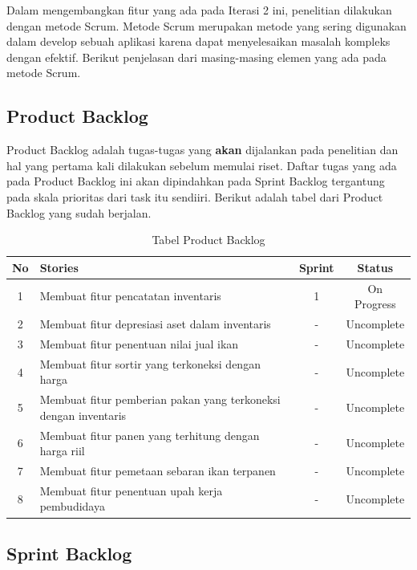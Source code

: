 Dalam mengembangkan fitur yang ada pada Iterasi 2 ini, penelitian dilakukan dengan metode Scrum. Metode Scrum merupakan metode yang sering digunakan dalam develop sebuah aplikasi karena dapat menyelesaikan masalah kompleks dengan efektif. Berikut penjelasan dari masing-masing elemen yang ada pada metode Scrum.

\subsection{Product Backlog}

Product Backlog adalah tugas-tugas yang \textbf{akan} dijalankan pada penelitian dan hal yang pertama kali dilakukan sebelum memulai riset. Daftar tugas yang ada pada Product Backlog ini akan dipindahkan pada Sprint Backlog tergantung pada skala prioritas dari task itu sendiiri. Berikut adalah tabel dari Product Backlog yang sudah berjalan.

\begin{table}[H]	
	\begin{center}
		\caption{Tabel Product Backlog}
		\label{tab:table5}
		\begin{tabular}{|c|m{17em}|c|c|}
		\hline
		\textbf{No} & \textbf{Stories} & \textbf{Sprint} & \textbf{Status} \\
		\hline
		1 & Membuat fitur pencatatan inventaris & 1 & On Progress \\
		\hline
		2 & Membuat fitur depresiasi aset dalam inventaris & - & Uncomplete \\
		\hline
		3 & Membuat fitur penentuan nilai jual ikan & - & Uncomplete \\
		\hline
		4 & Membuat fitur sortir yang terkoneksi dengan harga & - & Uncomplete \\
		\hline
		5 & Membuat fitur pemberian pakan yang terkoneksi dengan inventaris & - & Uncomplete \\
		\hline
		6 & Membuat fitur panen yang terhitung dengan harga riil & - & Uncomplete \\
		\hline
		7 & Membuat fitur pemetaan sebaran ikan terpanen & - & Uncomplete \\
		\hline
		8 & Membuat fitur penentuan upah kerja pembudidaya & - & Uncomplete \\
		\hline
		\end{tabular}
	\end{center}
\end{table}

\subsection{Sprint Backlog}

